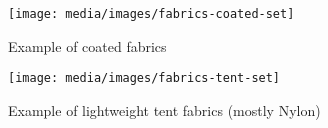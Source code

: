 \begin{figure}[H]
  \texttt{[image: media/images/fabrics-coated-set]}
  \caption{Example of coated fabrics}
  \label{img:fabrics-coated-set}
\end{figure}

\begin{figure}[H]
  \texttt{[image: media/images/fabrics-tent-set]}
  \caption{Example of lightweight tent fabrics (mostly Nylon)}
  \label{img:fabrics-tent-set}
\end{figure}
